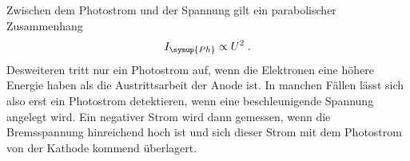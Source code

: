 Zwischen dem Photostrom und der Spannung gilt ein parabolischer Zusammenhang
\begin{equation*}
    I_{\symup{Ph}} \propto U^2 \; .
\end{equation*}
Desweiteren tritt nur ein Photostrom auf, wenn die Elektronen eine höhere Energie haben als die Austrittsarbeit 
der Anode ist. In manchen Fällen lässt sich also erst ein Photostrom detektieren, wenn eine beschleunigende 
Spannung angelegt wird. Ein negativer Strom wird dann gemessen, wenn die Bremsspannung hinreichend hoch 
ist und sich dieser Strom mit dem Photostrom von der Kathode kommend überlagert.